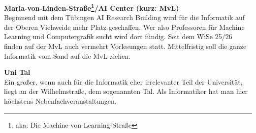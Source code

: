\textbf{Maria-von-Linden-Straße\footnote{aka: Die Machine-von-Learning-Straße}/AI Center (kurz: MvL)}\\
Beginnend mit dem Tübingen AI Research Building wird für die Informatik auf der Oberen Viehweide mehr Platz geschaffen. Wer also Professoren für Machine Learning und Computergrafik sucht wird dort fündig.
Seit dem WiSe 25/26 finden auf der MvL auch vermehrt Vorlesungen statt. Mittelfristig soll die ganze Informatik vom Sand auf die MvL ziehen.

\textbf{Uni Tal}\\
Ein großer, wenn auch für die Informatik eher irrelevanter Teil der Universität, liegt an der Wilhelmstraße, dem sogenannten Tal. Als Informatiker hat man hier höchstens Nebenfachveranstaltungen.
\vfill

